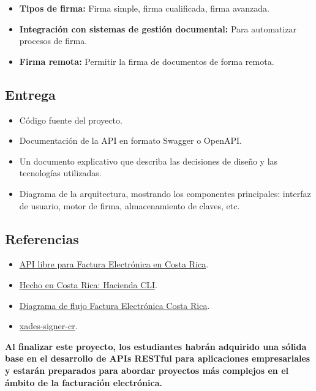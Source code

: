 \documentclass[
]{agujournal2019}
\begin{document}
\begin{itemize}
\item
  \textbf{Tipos de firma:} Firma simple, firma cualificada, firma
  avanzada.
\item
  \textbf{Integración con sistemas de gestión documental:} Para
  automatizar procesos de firma.
\item
  \textbf{Firma remota:} Permitir la firma de documentos de forma
  remota.
\end{itemize}

\subsection{Entrega}\label{entrega-2}

\begin{itemize}
\item
  Código fuente del proyecto.
\item
  Documentación de la API en formato Swagger o OpenAPI.
\item
  Un documento explicativo que describa las decisiones de diseño y las
  tecnologías utilizadas.
\item
  Diagrama de la arquitectura, mostrando los componentes principales:
  interfaz de usuario, motor de firma, almacenamiento de claves, etc.
\end{itemize}

\subsection{Referencias}\label{referencias-2}

\begin{itemize}
\item
  \href{https://github.com/CRLibre/API_Hacienda}{API libre para Factura
  Electrónica en Costa Rica}.
\item
  \href{https://medium.com/@kevinah95/hecho-en-costa-rica-hacienda-cli-d922490d6aca}{Hecho
  en Costa Rica: Hacienda CLI}.
\item
  \href{https://raw.githubusercontent.com/CRLibre/docs-fe-hacienda-cr/master/diagrama-flujo/Diagrama\%20de\%20Flujo\%20para\%20Factura\%20Electronica\%20Costa\%20Rica.png}{Diagrama
  de flujo Factura Electrónica Costa Rica}.
\item
  \href{https://github.com/johann04/xades-signer-cr}{xades-signer-cr}.
\end{itemize}

\textbf{Al finalizar este proyecto, los estudiantes habrán adquirido una
sólida base en el desarrollo de APIs RESTful para aplicaciones
empresariales y estarán preparados para abordar proyectos más complejos
en el ámbito de la facturación electrónica.}
\end{document}
